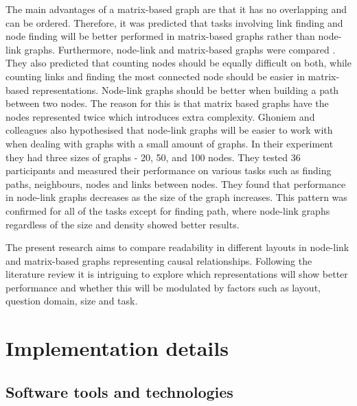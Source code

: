 \documentclass{l4proj}
\begin{document}
The main advantages of a matrix-based graph are that it has no overlapping and can be ordered. Therefore, it was predicted that tasks involving link finding and node finding will be better performed in matrix-based graphs rather than node-link graphs. Furthermore, node-link and matrix-based graphs were compared \cite{ghoniem2004comparison}. They also predicted that counting nodes should be equally difficult on both, while counting links and finding the most connected node should be easier in matrix-based representations. Node-link graphs should be better when building a path between two nodes. The reason for this is that matrix based graphs have the nodes represented twice which introduces extra complexity. Ghoniem and colleagues \cite{ghoniem2004comparison} also hypothesised that node-link graphs will be easier to work with when dealing with graphs with a small amount of graphs. In their experiment they had three sizes of graphs - 20, 50, and 100 nodes. They tested 36 participants and measured their performance on various tasks such as finding paths, neighbours, nodes and links between nodes. They found that performance in node-link graphs decreases as the size of the graph increases. This pattern was confirmed for all of the tasks except for finding path, where node-link graphs regardless of the size and density showed better results.

The present research aims to compare readability in different layouts in node-link and matrix-based graphs representing causal relationships. Following the literature review it is intriguing to explore which representations will show better performance and whether this will be modulated by factors such as layout, question domain, size and task.

\chapter{Implementation details}

\section{Software tools and technologies}
\end{document}

